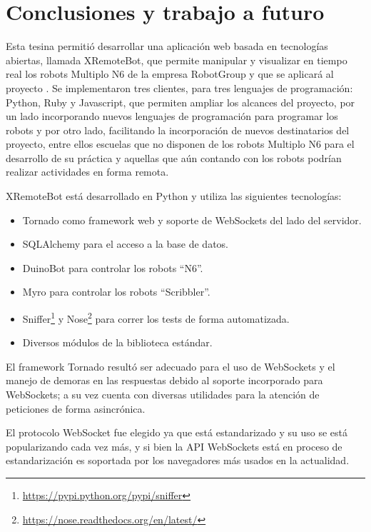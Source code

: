 \chapter{Conclusiones y trabajo a futuro}\label{cha:conclusiones}

Esta tesina permitió desarrollar una aplicación web basada en tecnologías abiertas, llamada XRemoteBot, que permite manipular y visualizar en tiempo real los robots Multiplo N6 de la empresa RobotGroup y que se aplicará al proyecto \proyecto{}. Se implementaron tres clientes, para tres lenguajes de programación: Python, Ruby y Javascript, que permiten ampliar los alcances del proyecto, por un lado incorporando nuevos lenguajes de programación para programar los robots y por otro lado, facilitando la incorporación de nuevos destinatarios del proyecto, entre ellos escuelas que no disponen de los robots Multiplo N6 para el desarrollo de su práctica y aquellas que aún contando con los robots podrían realizar actividades en forma remota.

XRemoteBot está desarrollado en Python y utiliza las siguientes tecnologías:
\begin{itemize}
    \item Tornado como framework web y soporte de WebSockets del lado del
    servidor.
    \item SQLAlchemy para el acceso a la base de datos.
    \item DuinoBot para controlar los robots ``N6''.
    \item Myro para controlar los robots ``Scribbler''.
    \item Sniffer\footnote{\url{https://pypi.python.org/pypi/sniffer}} y
    Nose\footnote{\url{https://nose.readthedocs.org/en/latest/}} para correr
    los tests de forma automatizada.
    \item Diversos módulos de la biblioteca estándar.
\end{itemize}

El framework Tornado resultó ser adecuado para el uso de WebSockets y el manejo
de demoras en las respuestas debido al soporte incorporado para WebSockets; a su vez
cuenta con diversas utilidades para la atención de peticiones
de forma asincrónica.

El protocolo WebSocket fue
elegido ya que está estandarizado y su uso se está popularizando cada vez más,
y si bien la API WebSockets está en proceso de estandarización es soportada
por los navegadores más usados en la actualidad.


